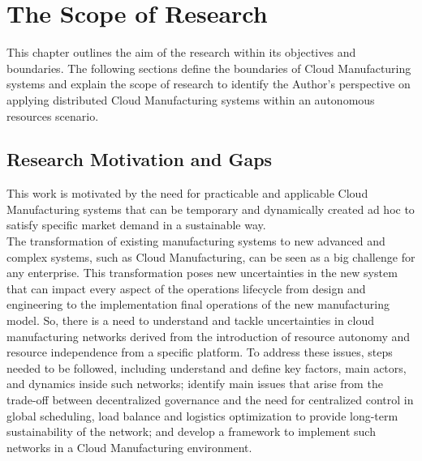 \chapter{The Scope of Research}
\label{chapter1}
This chapter outlines the aim of the research within its objectives and boundaries. The following sections define the boundaries of Cloud Manufacturing systems and explain the scope of research to identify the Author’s perspective on applying distributed Cloud Manufacturing systems within an autonomous resources scenario.\\
\section{Research Motivation and Gaps}
This work is motivated by the need for practicable and applicable Cloud Manufacturing systems that can be temporary and dynamically created ad hoc to satisfy specific market demand in a sustainable way.\\
The transformation of existing manufacturing systems to new advanced and complex systems, such as Cloud Manufacturing, can be seen as a big challenge for any enterprise. This transformation poses new uncertainties in the new system that can impact every aspect of the operations lifecycle from design and engineering to the implementation final operations of the new manufacturing model. So, there is a need to understand and tackle uncertainties in cloud manufacturing networks derived from the introduction of resource autonomy and resource independence from a specific platform. To address these issues, steps needed to be followed, including understand and define key factors, main actors, and dynamics inside such networks; identify main issues that arise from the trade-off between decentralized governance and the need for centralized control in global scheduling, load balance and logistics optimization to provide long-term sustainability of the network; and develop a framework to implement such networks in a Cloud Manufacturing environment.\\
